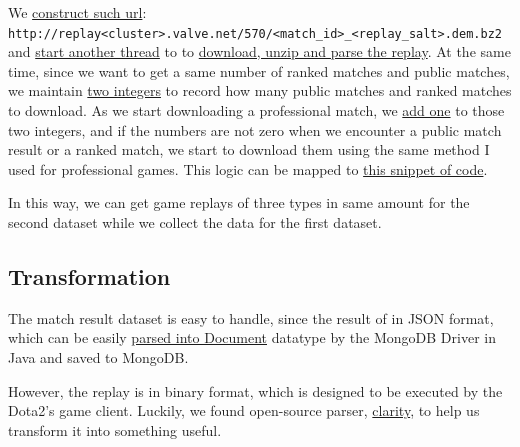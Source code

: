 \documentclass{article}
\newcommand{\codeinline}[1]{
    \texttt{#1}
}
\begin{document}
We \href{https://github.com/Vopaaz/big-data-psg-lgd/blob/a9a285e0e29c0d9e56b41994875df830c7e7b51b/src/main/java/FetchStore/OpendotaAPI.java#L17-L70}{construct such url}: \codeinline{http://replay<cluster>.valve.net/570/<match_id>_<replay_salt>.dem.bz2} and \href{https://github.com/Vopaaz/big-data-psg-lgd/blob/a9a285e0e29c0d9e56b41994875df830c7e7b51b/src/main/java/FetchStore/ValveAPI.java#L131-L144}{start another thread} to to \href{https://github.com/Vopaaz/big-data-psg-lgd/blob/a9a285e0e29c0d9e56b41994875df830c7e7b51b/src/main/java/FetchStore/ValveAPI.java#L389-L420}{download, unzip and parse the replay}.
At the same time, since we want to get a same number of ranked matches and public matches, we maintain \href{https://github.com/Vopaaz/big-data-psg-lgd/blob/a9a285e0e29c0d9e56b41994875df830c7e7b51b/src/main/java/FetchStore/ValveAPI.java#L46-L47}{two integers} to record how many public matches and ranked matches to download.
As we start downloading a professional match, we \href{https://github.com/Vopaaz/big-data-psg-lgd/blob/a9a285e0e29c0d9e56b41994875df830c7e7b51b/src/main/java/FetchStore/ValveAPI.java#L111-L112}{add one} to those two integers, and if the numbers are not zero when we encounter a public match result or a ranked match, we start to download them using the same method I used for professional games.
This logic can be mapped to \href{https://github.com/Vopaaz/big-data-psg-lgd/blob/a9a285e0e29c0d9e56b41994875df830c7e7b51b/src/main/java/FetchStore/ValveAPI.java#L104-L129}{this snippet of code}.

In this way, we can get game replays of three types in same amount for the second dataset while we collect the data for the first dataset.

\subsection{Transformation}

The match result dataset is easy to handle, since the result of in JSON format, which can be easily \href{https://github.com/Vopaaz/big-data-psg-lgd/blob/9916e0a5a95245062d110446eb4014312087ef9e/src/main/java/FetchStore/ValveAPI.java#L164-L178}{parsed into Document} datatype by the MongoDB Driver in Java and saved to MongoDB.

However, the replay is in binary format, which is designed to be executed by the Dota2's game client. Luckily, we found open-source parser, \href{https://github.com/skadistats/clarity}{clarity}, to help us transform it into something useful.
\end{document}
